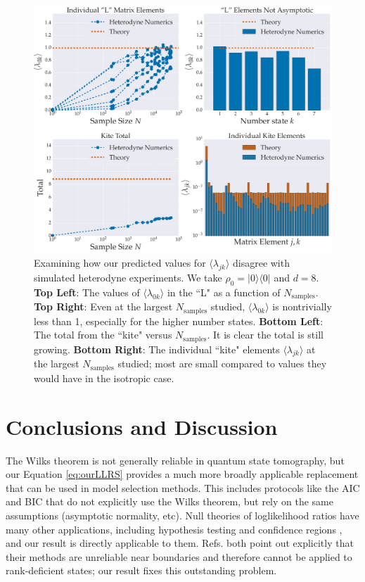 \documentclass[aps,pra, twocolumn]{revtex4-1}
\begin{document}
\begin{figure}[h]
  \includegraphics[width=\columnwidth]{Images/Figure_11.pdf}
 \caption{Examining how our predicted values for $\langle \lambda_{jk} \rangle$ disagree with simulated heterodyne experiments. We take $\rho_{0} = |0\rangle\langle 0|$ and $d=8$. \textbf{Top Left}: The values of  $\langle \lambda_{0k}\rangle$ in the ``L" as a function of $N_{\mathrm{samples}}$.  \textbf{Top Right}:  Even at the largest $N_{\mathrm{samples}}$ studied, $\langle \lambda_{0k}\rangle$ is nontrivially less than 1, especially for the higher number states. \textbf{Bottom Left}: The total from the ``kite" versus $N_{\mathrm{samples}}$. It is clear the total is still growing. \textbf{Bottom Right}: The individual ``kite" elements $\langle \lambda_{jk}\rangle$ at the largest $N_{\mathrm{samples}}$ studied;  most are small compared to values they would have in the isotropic case.}
\label{fig:individcontrib}
\end{figure}



\section{Conclusions and Discussion}
The Wilks theorem is not generally reliable in quantum state tomography, but our Equation \eqref{eq:ourLLRS} provides a much more broadly applicable replacement that can be used in model selection methods.  This includes protocols like the AIC and BIC \cite{Akaike1974, Schwarz1978, Kass1995, Burnham2004} that do not explicitly use the Wilks theorem, but rely on the same assumptions (asymptotic normality, etc).  Null theories of loglikelihood ratios have many other applications, including hypothesis testing \cite{Blume-Kohout2010,Moroder2013} and confidence regions \cite{Glancy2012a}, and our result is directly applicable to them.  Refs. \cite{Moroder2013,Glancy2012a} both point out explicitly that their methods are unreliable near boundaries and therefore cannot be applied to rank-deficient states; our result fixes this outstanding problem.
\end{document}
